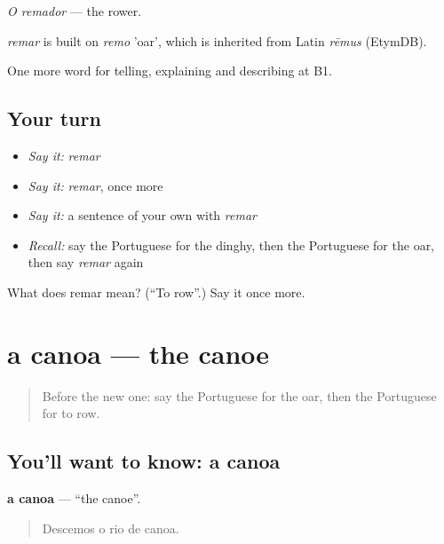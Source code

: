 \emph{O remador} — the rower.

\begin{cousinweb}
\emph{remar} is built on \emph{remo} 'oar', which is inherited from Latin \emph{rēmus} (EtymDB).
\end{cousinweb}

\begin{grammarlens}[title={What you've built}]
One more word for telling, explaining and describing at B1.
\end{grammarlens}

\subsection*{Your turn}
\begin{itemize}
\raggedright
  \item \emph{Say it:} \emph{remar}
  \item \emph{Say it:} \emph{remar}, once more
  \item \emph{Say it:} a sentence of your own with \emph{remar}
  \item \emph{Recall:} say the Portuguese for the dinghy, then the Portuguese for the oar, then say \emph{remar} again
\end{itemize}

\begin{tcolorbox}[breakable,colback=teal!4,colframe=teal!35!black,title={Before you move on}]
What does remar mean? (\textquotedblleft{}To row\textquotedblright{}.) Say it once more.
\end{tcolorbox}
\section[a canoa]{a canoa — the canoe}

\label{lesson:PT-C418-canoa}



\begin{quote}
Before the new one: say the Portuguese for the oar, then the Portuguese for to row.
\end{quote}

\subsection*{You'll want to know: a canoa}
\textbf{a canoa} — \textquotedblleft{}the canoe\textquotedblright{}.

\begin{quote}
Descemos o rio de canoa.
\end{quote}

